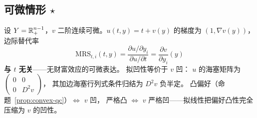 \subsection{可微情形 \texorpdfstring{$\star$}{*}}

设 $Y=\mathbb{R}^{n-1}_+$，$v$ 二阶连续可微。$u(t,y)=t+v(y)$ 的梯度为 $(1,\nabla v(y))$，
边际替代率
\[
\mathrm{MRS}_{t,i}(t,y)=\frac{\partial u/\partial y_i}{\partial u/\partial t}=\frac{\partial v}{\partial y_i}(y)
\]
\textbf{与 $t$ 无关}——无财富效应的可微表达。
拟凹性等价于 $v$ 凹：
$u$ 的海塞矩阵为 $\begin{pmatrix}0&0\\0&D^2v\end{pmatrix}$，
其加边海塞行列式条件归结为 $D^2v$ 负半定。
凸偏好（命题~\ref{prop:convex-qc}）$\iff$ $v$ 凹，
严格凸 $\iff$ $v$ 严格凹——拟线性把偏好凸性完全压缩为 $v$ 的凹性。

